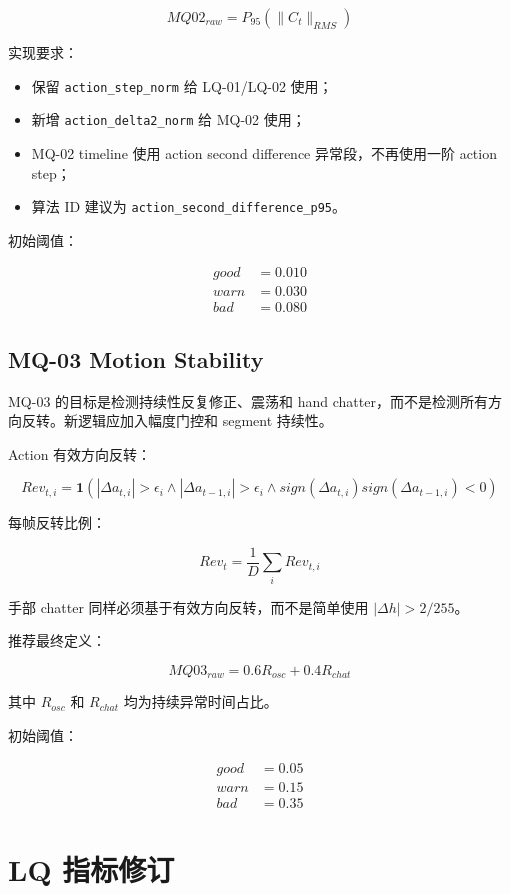 \documentclass[UTF8,zihao=-4,oneside,openany]{ctexrep}
\newcommand{\Code}[1]{\texttt{#1}}
\begin{document}
\[
MQ02_{raw}=P_{95}(\|C_t\|_{RMS})
\]

实现要求：

\begin{itemize}
\item 保留 \Code{action\_step\_norm} 给 LQ-01/LQ-02 使用；
\item 新增 \Code{action\_delta2\_norm} 给 MQ-02 使用；
\item MQ-02 timeline 使用 action second difference 异常段，不再使用一阶 action step；
\item 算法 ID 建议为 \Code{action\_second\_difference\_p95}。
\end{itemize}

初始阈值：

\[
\begin{aligned}
good &= 0.010\\
warn &= 0.030\\
bad &= 0.080
\end{aligned}
\]

\subsection{MQ-03 Motion Stability}

MQ-03 的目标是检测持续性反复修正、震荡和 hand chatter，而不是检测所有方向反转。新逻辑应加入幅度门控和 segment 持续性。

Action 有效方向反转：

\[
Rev_{t,i}=\mathbf1(|\Delta a_{t,i}|>\epsilon_i \land |\Delta a_{t-1,i}|>\epsilon_i \land sign(\Delta a_{t,i})sign(\Delta a_{t-1,i})<0)
\]

每帧反转比例：

\[
Rev_t=\frac{1}{D}\sum_i Rev_{t,i}
\]

手部 chatter 同样必须基于有效方向反转，而不是简单使用 \(|\Delta h|>2/255\)。

推荐最终定义：

\[
MQ03_{raw}=0.6R_{osc}+0.4R_{chat}
\]

其中 \(R_{osc}\) 和 \(R_{chat}\) 均为持续异常时间占比。

初始阈值：

\[
\begin{aligned}
good &= 0.05\\
warn &= 0.15\\
bad &= 0.35
\end{aligned}
\]

\section{LQ 指标修订}
\end{document}
